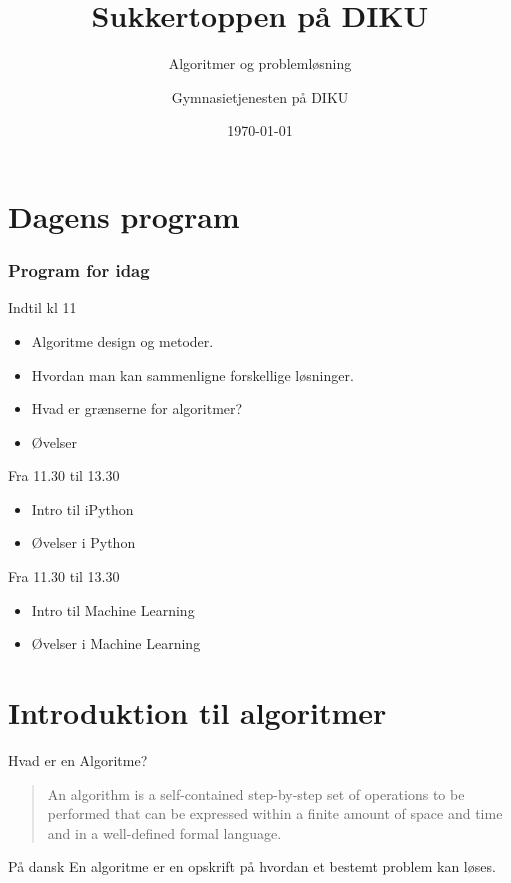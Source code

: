 \documentclass[12pt,t]{beamer}
\title{Sukkertoppen på DIKU}
\subtitle{Algoritmer og problemløsning}
\author{
        Gymnasietjenesten på DIKU
}
\date[]{\today}
\begin{document}
\frame[plain]{\titlepage}
 \frame{\tableofcontents}

\section{Dagens program}

\begin{frame}
    \frametitle{Program for idag}
    \begin{block}{Indtil kl 11}
        \begin{itemize}
            \item Algoritme design og metoder. \pause
            \item Hvordan man kan sammenligne forskellige løsninger. \pause
            \item Hvad er grænserne for algoritmer? \pause
            \item Øvelser
        \end{itemize}
    \end{block}
    \pause
    \begin{block}{Fra 11.30 til 13.30}
        \begin{itemize}
            \item Intro til iPython \pause
            \item Øvelser i Python
        \end{itemize}
    \end{block}
    \pause
    \begin{block}{Fra 11.30 til 13.30}
        \begin{itemize}
            \item Intro til Machine Learning \pause
            \item Øvelser i Machine Learning
        \end{itemize}
    \end{block}
\end{frame}


\section{Introduktion til algoritmer}
    \begin{frame}[c]{Hvad er en Algoritme?}
        \begin{quote}
            An algorithm is a self-contained step-by-step set of operations to
            be performed that can be expressed within a finite amount of space
            and time and in a well-defined formal language.
        \end{quote}
        \pause
        \begin{block}{På dansk}
            En algoritme er en \alert{opskrift} på hvordan et bestemt problem
            kan løses.
        \end{block}
    \end{frame}
\end{document}
